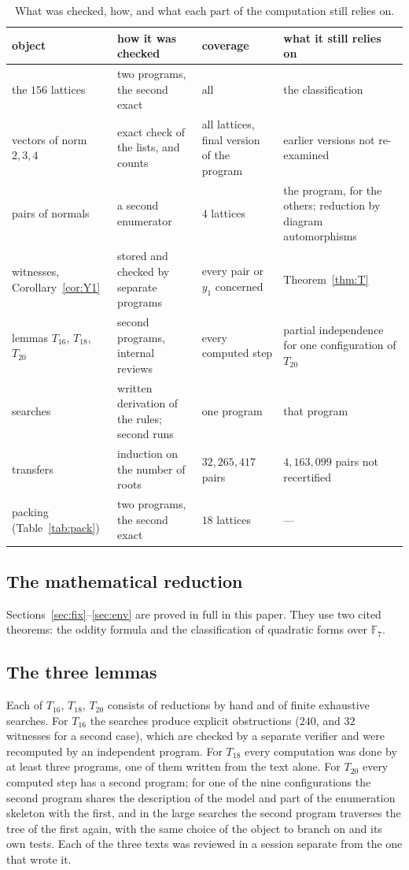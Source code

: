 \documentclass[11pt]{amsart}
\theoremstyle{definition}
\theoremstyle{remark}
\newcommand{\F}{\mathbb{F}}
\begin{document}
\begin{table}[ht]
\centering\footnotesize
\begin{tabular}{p{27mm}p{43mm}p{35mm}p{38mm}}
\toprule
object & how it was checked & coverage & what it still relies on\\
\midrule
the $156$ lattices & two programs, the second exact & all & the classification \cite{Bor}\\
vectors of norm $2,3,4$ & exact check of the lists, and counts & all lattices, final version of the program & earlier
versions not re-examined\\
pairs of normals & a second enumerator & $4$ lattices & the program, for the others; reduction by diagram automorphisms\\
witnesses, Corollary~\ref{cor:Y1} & stored and checked by separate programs & every pair or $y_1$ concerned &
Theorem~\ref{thm:T}\\
lemmas $T_{16}$, $T_{18}$, $T_{20}$ & second programs, internal reviews & every computed step & partial independence for
one configuration of $T_{20}$\\
searches & written derivation of the rules; second runs & one program & that program\\
transfers & induction on the number of roots & $32{,}265{,}417$ pairs & $4{,}163{,}099$ pairs not recertified\\
packing (Table~\ref{tab:pack}) & two programs, the second exact & $18$ lattices & ---\\
\bottomrule
\end{tabular}
\caption{What was checked, how, and what each part of the computation still relies on.}\label{tab:verif}
\end{table}

\subsection*{The mathematical reduction} Sections~\ref{sec:fix}--\ref{sec:env} are proved in full in this paper. They use two
cited theorems: the oddity formula and the classification of quadratic forms over $\F_7$.

\subsection*{The three lemmas} Each of $T_{16}$, $T_{18}$, $T_{20}$ consists of reductions by hand and of finite exhaustive
searches. For $T_{16}$ the searches produce explicit obstructions ($240$, and $32$ witnesses for a second case), which are
checked by a separate verifier and were recomputed by an independent program. For $T_{18}$ every computation was done by at
least three programs, one of them written from the text alone. For $T_{20}$ every computed step has a second program; for
one of the nine configurations the second program shares the description of the model and part of the enumeration skeleton
with the first, and in the large searches the second program traverses the tree of the first again, with the same choice of
the object to branch on and its own tests. Each of the three texts was reviewed in a session separate from the one that wrote it.
\end{document}
